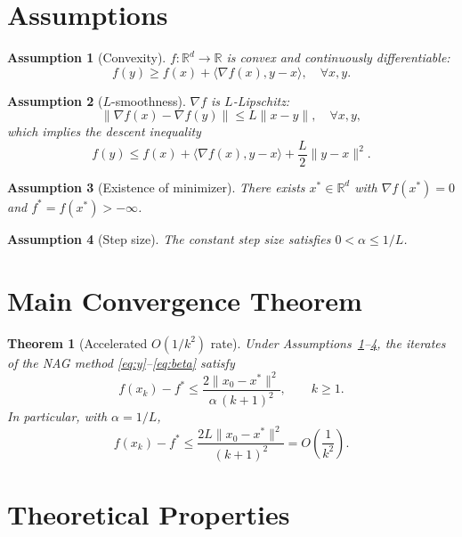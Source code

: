 \documentclass{article}
\newtheorem{theorem}{Theorem}
\newtheorem{assumption}{Assumption}
\begin{document}
\section*{Assumptions}

\begin{assumption}[Convexity]\label{as:conv}
$f:\mathbb{R}^d \to \mathbb{R}$ is convex and continuously differentiable:
\[
f(y) \ge f(x) + \langle \nabla f(x), y - x \rangle, \quad \forall x, y.
\]
\end{assumption}

\begin{assumption}[$L$-smoothness]\label{as:smooth}
$\nabla f$ is $L$-Lipschitz:
\[
\|\nabla f(x) - \nabla f(y)\| \le L\|x-y\|, \quad \forall x, y,
\]
which implies the descent inequality
\[
f(y) \le f(x) + \langle \nabla f(x), y - x \rangle + \frac{L}{2}\|y - x\|^2.
\]
\end{assumption}

\begin{assumption}[Existence of minimizer]\label{as:min}
There exists $x^* \in \mathbb{R}^d$ with $\nabla f(x^*) = 0$ and
$f^* = f(x^*) > -\infty$.
\end{assumption}

\begin{assumption}[Step size]\label{as:step}
The constant step size satisfies $0 < \alpha \le 1/L$.
\end{assumption}

\section*{Main Convergence Theorem}

\begin{theorem}[Accelerated $O(1/k^2)$ rate]\label{thm:main}
Under Assumptions~\ref{as:conv}--\ref{as:step}, the iterates of the NAG method
\eqref{eq:y}--\eqref{eq:beta} satisfy
\[
f(x_k) - f^* \le \frac{2\|x_0 - x^*\|^2}{\alpha\, (k+1)^2},
\qquad k \ge 1.
\]
In particular, with $\alpha = 1/L$,
\[
f(x_k) - f^* \le \frac{2L\|x_0 - x^*\|^2}{(k+1)^2} = O\!\left(\frac{1}{k^2}\right).
\]
\end{theorem}

\section*{Theoretical Properties}
\end{document}
